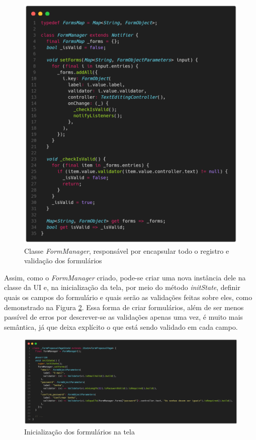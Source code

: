 \documentclass[12pt, %
openright, 
oneside, %
a4paper,    %
brazil]{facom-ufu-abntex2}
\begin{document}
\begin{figure}[ht]
    \centering
    \includegraphics[width=.7\textwidth, trim={0 30 0 100}, clip]{figures/forms/form_manager.png}
    \caption{Classe \textit{FormManager}, responsável por encapsular todo o registro e validação dos formulários}
    \label{fig:form_manager}
\end{figure}

Assim, como o \textit{FormManager} criado, pode-se criar uma nova instância dele na classe da UI e, na inicialização da tela, por meio do método \textit{initState}, definir quais os campos do formulário e quais serão as validações feitas sobre eles, como demonstrado na Figura \ref{fig:set_forms}. Essa forma de criar formulários, além de ser menos passível de erros por descrever-se as validações apenas uma vez, é muito mais semântica, já que deixa explícito o que está sendo validado em cada campo.

\begin{figure}[ht]
    \centering
    \includegraphics[width=1\textwidth, trim={0 30 0 100}, clip]{figures/forms/set_forms.png}
    \caption{Inicialização dos formulários na tela}
    \label{fig:set_forms}
\end{figure}
\end{document}
